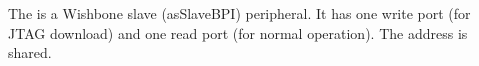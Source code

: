 The \asimemg is a Wishbone slave (asSlaveBPI) peripheral. It has one write port (for JTAG download) and one read port (for normal operation). The address is shared. 
